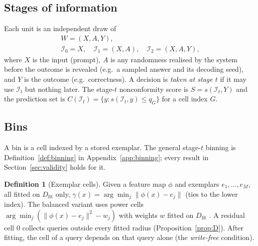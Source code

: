 \documentclass[11pt]{article}
\theoremstyle{definition}
\newtheorem{definition}[theorem]{Definition}
\theoremstyle{remark}
\newcommand{\Dfit}{D_{\mathrm{fit}}}
\newcommand{\Info}{\mathcal{I}}
\newcommand{\1}{\mathbf{1}}
\begin{document}
\subsection{Stages of information}
Each unit is an independent draw of
\begin{gather*}
  W = (X, A, Y),\\
  \Info_0 = X,\quad \Info_1 = (X, A),\quad \Info_2 = (X, A, Y),
\end{gather*}
where $X$ is the input (prompt), $A$ is any randomness realised by the system
before the outcome is revealed (e.g.\ a sampled answer and its decoding seed),
and $Y$ is the outcome (e.g.\ correctness). A decision is \emph{taken at stage
$t$} if it may use $\Info_t$ but nothing later. The stage-$t$ nonconformity score
is $S = s(\Info_t, Y)$ and the prediction set is
$C(\Info_t) = \{y : s(\Info_t, y) \le q_{G}\}$ for a cell index $G$.



\subsection{Bins}
A bin is a cell indexed by a stored exemplar.  The general
stage-$t$ binning is Definition~\ref{def:binning} in Appendix~\ref{app:binning}; every
result in Section~\ref{sec:validity} holds for it.

\begin{definition}[Exemplar cells]
\label{def:exemplar}
Given a feature map $\phi$ and exemplars $e_1,\dots,e_M$, all fitted on $\Dfit$ only,
$\gamma(x)=\arg\min_j \|\phi(x)-e_j\|$ (ties to the lower index). The balanced variant uses
power cells $\arg\min_j(\|\phi(x)-e_j\|^2-w_j)$ with weights $w$ fitted on $\Dfit$
. A residual cell $0$ collects queries outside every fitted radius
(Proposition~\ref{prop:D}). After fitting, the cell of a query depends on that query
alone (the \emph{write-free} condition).
\end{definition}



\end{document}
